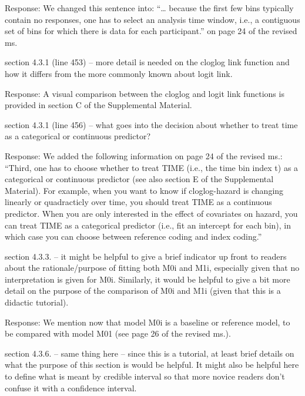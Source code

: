 \documentclass[
]{article}
\renewenvironment{quote}{\begin{leftbar}}{\end{leftbar}}
\begin{document}
Response: We changed this sentence into: ``\ldots{} because the first
few bins typically contain no responses, one has to select an analysis
time window, i.e., a contiguous set of bins for which there is data for
each participant.'' on page 24 of the revised ms.

\begin{quote}
section 4.3.1 (line 453) -- more detail is needed on the cloglog link
function and how it differs from the more commonly known about logit
link.
\end{quote}

Response: A visual comparison between the cloglog and logit link
functions is provided in section C of the Supplemental Material.

\begin{quote}
section 4.3.1 (line 456) -- what goes into the decision about whether to
treat time as a categorical or continuous predictor?
\end{quote}

Response: We added the following information on page 24 of the revised
ms.: ``Third, one has to choose whether to treat TIME (i.e., the time
bin index t) as a categorical or continuous predictor (see also section
E of the Supplemental Material). For example, when you want to know if
cloglog-hazard is changing linearly or quadracticly over time, you
should treat TIME as a continuous predictor. When you are only
interested in the effect of covariates on hazard, you can treat TIME as
a categorical predictor (i.e., fit an intercept for each bin), in which
case you can choose between reference coding and index coding.''

\begin{quote}
section 4.3.3. -- it might be helpful to give a brief indicator up front
to readers about the rationale/purpose of fitting both M0i and M1i,
especially given that no interpretation is given for M0i. Similarly, it
would be helpful to give a bit more detail on the purpose of the
comparison of M0i and M1i (given that this is a didactic tutorial).
\end{quote}

Response: We mention now that model M0i is a baseline or reference
model, to be compared with model M01 (see page 26 of the revised ms.).

\begin{quote}
section 4.3.6. -- same thing here -- since this is a tutorial, at least
brief details on what the purpose of this section is would be helpful.
It might also be helpful here to define what is meant by credible
interval so that more novice readers don't confuse it with a confidence
interval.
\end{quote}
\end{document}

